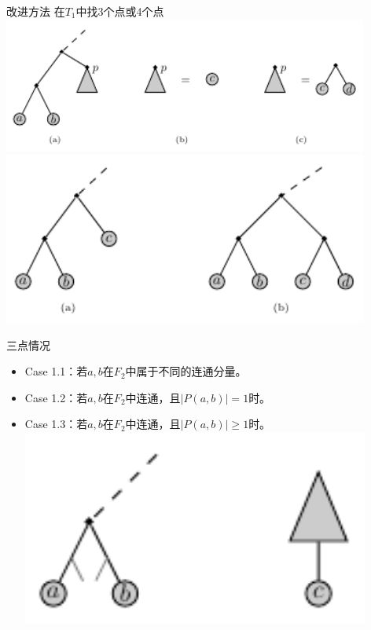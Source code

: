 \documentclass[slidestop,compress,mathserif,red]{beamer}
\begin{document}
\begin{frame}{改进方法}
    在$T_1$中找3个点或4个点
    \includegraphics[width=0.9\textwidth, height=0.4\textheight, keepaspectratio]{./pic/3and4_pro.pdf}\\
    \pause
    \includegraphics[width=0.9\textwidth, height=0.4\textheight, keepaspectratio]{./pic/3and4.pdf}
\end{frame}

\begin{frame}{三点情况}
\begin{itemize}
  \item Case 1.1：若$a,b$在$F_2$中属于不同的连通分量。
  \pause
  \item Case 1.2：若$a,b$在$F_2$中连通，且$|P(a,b)|=1$时。
  \pause
  \item Case 1.3：若$a,b$在$F_2$中连通，且$|P(a,b)| \ge 1$时。\\
  \includegraphics[width=0.9\textwidth, height=0.4\textheight, keepaspectratio]{./pic/case_1_3.pdf}
\end{itemize}
\end{frame}
\end{document}
